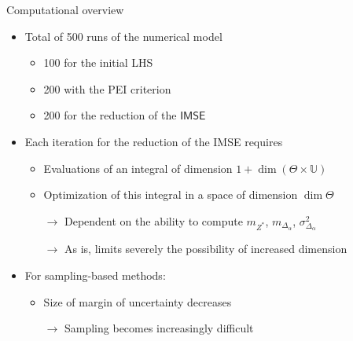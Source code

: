 \documentclass[10pt,aspectratio=169,usepdftitle=false]{beamer}
\newcommand{\Uspace}{\mathbb{U}}
\newcommand{\Kspace}{\Theta}
\newcommand{\Ex}{\mathbb{E}}
\begin{document}
\begin{frame}{Computational overview}
  \begin{itemize}
  \item Total of 500 runs of the numerical model
    \begin{itemize}
    \item 100 for the initial LHS
    \item 200 with the PEI criterion
    \item 200 for the reduction of the $\mathsf{IMSE}$
    \end{itemize}
    
  \item Each iteration for the reduction of the IMSE requires
  \begin{itemize}
  \item Evaluations of an integral of dimension $1 + \dim (\Kspace \times \Uspace)$
  \item Optimization of this integral in a space of dimension $\dim \Kspace$
  \item[$\rightarrow$] Dependent on the ability to compute $m_{Z^*}$, $m_{\Delta_{\alpha}}$, $\sigma^2_{\Delta_{\alpha}}$
   \item[$\rightarrow$] As is, limits severely the possibility of increased dimension
   \end{itemize}
 \item For sampling-based methods:
   \begin{itemize}
   \item Size of margin of uncertainty decreases
   \item[$\rightarrow$] Sampling becomes increasingly difficult
   \end{itemize}
  \end{itemize}
\end{frame}
\end{document}
